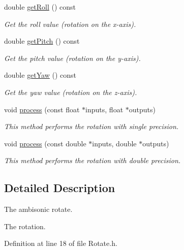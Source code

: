 \begin{DoxyCompactItemize}
double \hyperlink{class_hoa3_d_1_1_rotate_a4da29df01f2c7311490df11d4322b5f8}{get\-Roll} () const 
\begin{DoxyCompactList}\small\item\em Get the roll value (rotation on the x-\/axis). \end{DoxyCompactList}\item 
double \hyperlink{class_hoa3_d_1_1_rotate_afe1e5ccea5d375b082b7df2b8c8b972a}{get\-Pitch} () const 
\begin{DoxyCompactList}\small\item\em Get the pitch value (rotation on the y-\/axis). \end{DoxyCompactList}\item 
double \hyperlink{class_hoa3_d_1_1_rotate_a386f1fba4ceab4c2e243b7a222124d7e}{get\-Yaw} () const 
\begin{DoxyCompactList}\small\item\em Get the yaw value (rotation on the z-\/axis). \end{DoxyCompactList}\item 
void \hyperlink{class_hoa3_d_1_1_rotate_a9851055e9dbe808578e435c65f22c06a}{process} (const float $\ast$inputs, float $\ast$outputs)
\begin{DoxyCompactList}\small\item\em This method performs the rotation with single precision. \end{DoxyCompactList}\item 
void \hyperlink{class_hoa3_d_1_1_rotate_a395dafa6cc2d92562e6ac8044a438b2c}{process} (const double $\ast$inputs, double $\ast$outputs)
\begin{DoxyCompactList}\small\item\em This method performs the rotation with double precision. \end{DoxyCompactList}\end{DoxyCompactItemize}


\subsection{Detailed Description}
The ambisonic rotate. 

The rotation. 

Definition at line 18 of file Rotate.\-h.



